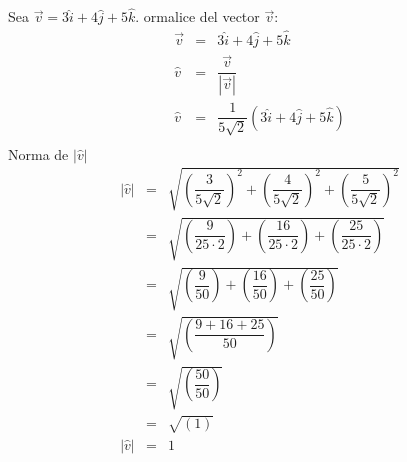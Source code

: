 \begin{myexample}
Sea $\vec{v}=3\hat{i}+4\hat{j}+5\hat{k}$. ormalice del vector $\vec{v}$:
\begin{eqnarray*}
\vec{v}&=&3\hat{i}+4\hat{j}+5\hat{k}\\
\hat{v}&=&\dfrac{\vec{v}}{|\vec{v}|}\\
\hat{v}&=&\dfrac{1}{5\sqrt{2}}\left( 3\hat{i}+4\hat{j}+5\hat{k}\right)\\
\end{eqnarray*}
Norma de $|\hat{v}|$
\begin{eqnarray*}
|\hat{v}|&=&\sqrt{\left(\dfrac{3}{5\sqrt{2}}\right)^{2}+\left(\dfrac{4}{5\sqrt{2}}\right)^{2}+\left(\dfrac{5}{5\sqrt{2}}\right)^{2}}\\
&=&\sqrt{\left(\dfrac{9}{25\cdot 2}\right)+\left(\dfrac{16}{25\cdot 2}\right)+\left(\dfrac{25}{25\cdot 2}\right)}\\
&=&\sqrt{\left(\dfrac{9}{50}\right)+\left(\dfrac{16}{50}\right)+\left(\dfrac{25}{50}\right)}\\
&=&\sqrt{\left(\dfrac{9+16+25}{50}\right)}\\
&=&\sqrt{\left(\dfrac{50}{50}\right)}\\
&=&\sqrt{\left(1\right)}\\
|\hat{v}|&=&1\\
\end{eqnarray*}
\end{myexample}



